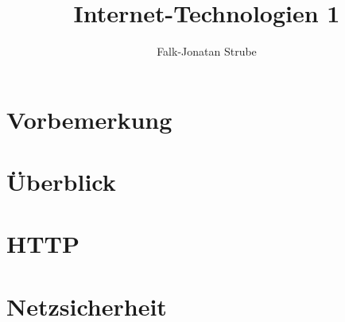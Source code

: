 \documentclass{scrreprt}
\title{Internet-Technologien 1}
\author{Falk-Jonatan Strube}
\begin{document}
\maketitle
\tableofcontents

\chapter*{Vorbemerkung}

\chapter{Überblick}


\chapter{HTTP}


\chapter{Netzsicherheit}



\end{document}
